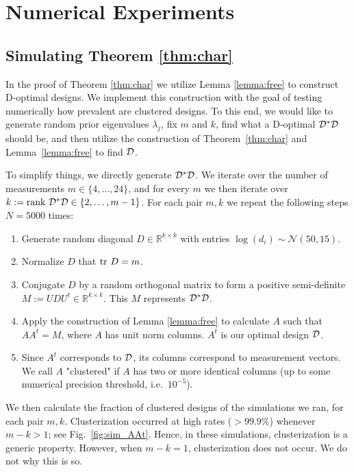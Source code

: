 \section{Numerical Experiments}


\subsection{Simulating Theorem \ref{thm:char}}\label{subsec:lemma_sims}
In the proof of Theorem \ref{thm:char} we utilize Lemma
\ref{lemma:free} to construct D-optimal designs. We implement this
construction with the goal of testing numerically how prevalent are
clustered designs. To this end, we would like to generate random prior
eigenvalues $\lambda_j$, fix $m$ and $k$, find what a D-optimal
$\mathcal{D}^*\mathcal{D}$ should be, and then utilize the construction of
Theorem~\ref{thm:char} and Lemma~\ref{lemma:free} to find $\mathcal{D}$.


To simplify things, we directly generate $\mathcal{D}^*\mathcal{D}$. We iterate over
the number of measurements $m \in \{4,\dots, 24\}$, and for every $m$
we then iterate over $k:=\textup{rank}\  \mathcal{D}^*\mathcal{D} \in \{2,\dots, m-1\}$. For
each pair $m,k$ we repeat the following steps $N=5000$ times:
\begin{enumerate}
\item Generate random diagonal $D\in \mathbb{R}^{k\times k}$ with
  entries $\log (d_i) \sim \mathcal{N}(50,15)$.
\item Normalize $D$ that $\textup{tr}\ D = m$.
\item Conjugate $D$ by a random orthogonal matrix to form a positive
  semi-definite $M := UDU^t \in \mathbb{R}^{k\times k}$. This $M$
  represents $\mathcal{D}^*\mathcal{D}$.
\item Apply the construction of Lemma \ref{lemma:free} to calculate
  $A$ such that $AA^t = M$, where $A$ has unit norm columns. $A^t$ is
  our optimal design $\mathcal{D}$.
\item Since $A^t$ corresponds to $\mathcal{D}$, its columns correspond to
  measurement vectors. We call $A$ "clustered" if $A$ has two or more
  identical columns (up to some numerical precision threshold,
  i.e.~$10^{-5}$).
\end{enumerate}
We then calculate the fraction of clustered designs of the simulations
we ran, for each pair $m,k$. Clusterization occurred at high rates
($>99.9\%$) whenever $m-k > 1$; see Fig.~\ref{fig:sim_AAt}. Hence, in
these simulations, clusterization is a generic property. However, when
$m-k = 1$, clusterization does not occur. We do not why this is so.

